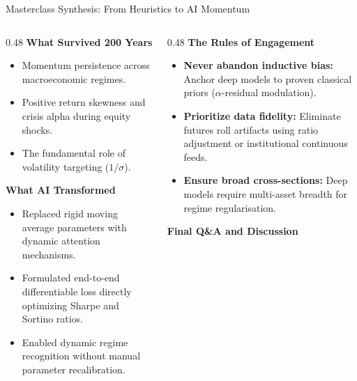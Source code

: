 \documentclass[10pt]{beamer}
\begin{document}
\begin{frame}{Masterclass Synthesis: From Heuristics to AI Momentum}
  \begin{columns}[t]
    \begin{column}{0.48\textwidth}
      \textbf{\scriptsize What Survived 200 Years}
      \begin{itemize}\scriptsize
        \item Momentum persistence across macroeconomic regimes.
        \item Positive return skewness and crisis alpha during equity shocks.
        \item The fundamental role of volatility targeting ($1/\sigma$).
      \end{itemize}
      \textbf{\scriptsize What AI Transformed}
      \begin{itemize}\scriptsize
        \item Replaced rigid moving average parameters with dynamic attention mechanisms.
        \item Formulated end-to-end differentiable loss directly optimizing Sharpe and Sortino ratios.
        \item Enabled dynamic regime recognition without manual parameter recalibration.
      \end{itemize}
    \end{column}
    \begin{column}{0.48\textwidth}
      \textbf{\scriptsize The Rules of Engagement}
      \begin{itemize}\scriptsize
        \item \textbf{Never abandon inductive bias:} Anchor deep models to proven classical priors ($\alpha$-residual modulation).
        \item \textbf{Prioritize data fidelity:} Eliminate futures roll artifacts using ratio adjustment or institutional continuous feeds.
        \item \textbf{Ensure broad cross-sections:} Deep models require multi-asset breadth for regime regularisation.
      \end{itemize}
      \vspace{0.1cm}
      \begin{center}
        \textbf{Final Q\&A and Discussion}
      \end{center}
    \end{column}
  \end{columns}
\end{frame}
\end{document}
